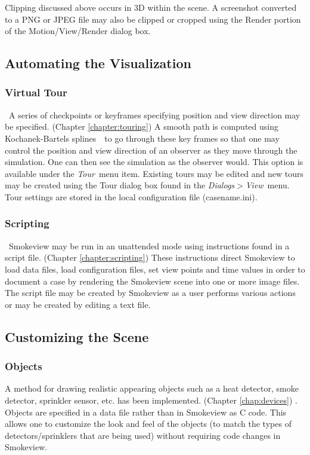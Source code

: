 \documentclass[11pt,twoside]{book}
\begin{document}
Clipping discussed above occurs in 3D within the scene.  A
screenshot converted to a PNG or JPEG file may also be clipped or
cropped using the Render portion of the Motion/View/Render
dialog box.

\subsection{Automating the Visualization}
\subsubsection{Virtual Tour}\   A series of checkpoints or keyframes
specifying position and view direction may be specified. (Chapter
\ref{chapter:touring}) A smooth path is computed using
Kochanek-Bartels splines~\cite{Moller:02}\ to go through these key
frames so that one may control the position and view direction of
an observer as they move through the simulation. One can then see
the simulation as the observer would. This option is available
under the {\em Tour}\ menu item. Existing tours may be edited and
new tours may be created using the Tour dialog box found in
the {\em Dialogs$>$View}\ menu. Tour settings are stored in the local
configuration file (casename.ini).

\subsubsection{Scripting}\ Smokeview may be run in an unattended mode using
instructions found in a script file. (Chapter
\ref{chapter:scripting}) These instructions direct Smokeview to
load data files, load configuration files, set view points and
time values in order to document a case by rendering the Smokeview
scene into one or more image files. The script file may be created
by Smokeview as a user performs various actions or may be created
by editing a text file.

\subsection{Customizing the Scene}

\subsubsection{Objects}A method for drawing realistic appearing objects such as a heat detector,
smoke detector, sprinkler sensor, etc. has been implemented.
(Chapter \ref{chap:devices}) . Objects are specified in a data
file rather than in Smokeview as C code. This allows one to
customize the look and feel of the objects (to match the types of
detectors/sprinklers that are being used) without requiring code
changes in Smokeview.
\end{document}
